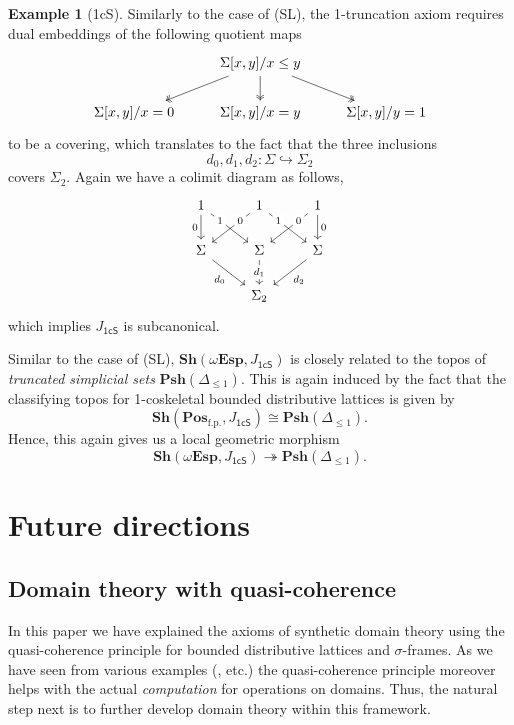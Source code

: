 \documentclass[a4paper,12pt]{amsart}
\theoremstyle{definition}
\newtheorem{example}[theorem]{Example}
\newcommand{\mb}[1]{\mathbf{#1}}
\newcommand{\mr}[1]{\mathrm{#1}}
\newcommand{\ms}[1]{\mathsf{#1}}
\newcommand{\Pos}{\mb{Pos}}
\newcommand{\sh}{\mb{Sh}}
\newcommand{\psh}{\mb{Psh}}
\newcommand{\surj}{\twoheadrightarrow}
\newcommand{\hook}{\hookrightarrow}
\newcommand{\fp}{_{\mr{f.p.}}}
\newcommand{\wTop}{\omega\mb{Esp}}
\begin{document}
\begin{example}[1cS]\label{exm:model1T}
  Similarly to the case of (SL), the 1-truncation axiom requires dual embeddings of the following quotient maps
  \[\begin{tikzcd}
    & {\Sigma[x,y]/x\le y} \\
    {\Sigma[x,y]/x=0} & {\Sigma[x,y]/x=y} & {\Sigma[x,y]/y=1}
    \arrow[two heads, from=1-2, to=2-1]
    \arrow[two heads, from=1-2, to=2-2]
    \arrow[two heads, from=1-2, to=2-3]
  \end{tikzcd}\]
  to be a covering, which translates to the fact that the three inclusions
  \[ d_0,d_1,d_2 : \Sigma \hook \Sigma_2 \]
  covers $\Sigma_2$. Again we have a colimit diagram as follows, 
  \[\begin{tikzcd}
    1 & 1 & 1 \\
    \Sigma & \Sigma & \Sigma \\
    & {\Sigma_2}
    \arrow["0"', from=1-1, to=2-1]
    \arrow["1"{description, pos=0.25}, from=1-1, to=2-2]
    \arrow["0"{description, pos=0.25}, from=1-2, to=2-1]
    \arrow["1"{description, pos=0.25}, from=1-2, to=2-3]
    \arrow["0"{description, pos=0.25}, from=1-3, to=2-2]
    \arrow["0", from=1-3, to=2-3]
    \arrow["{d_0}"', from=2-1, to=3-2]
    \arrow["{d_1}"{description}, from=2-2, to=3-2]
    \arrow["{d_2}", from=2-3, to=3-2]
  \end{tikzcd}\]
  which implies $J_{\ms{1cS}}$ is subcanonical.
  
  Similar to the case of (SL), $\sh(\wTop,J_{\ms{1cS}})$ is closely related to the topos of \emph{truncated simplicial sets} $\psh(\Delta_{\le 1})$. This is again induced by the fact that the classifying topos for 1-coskeletal bounded distributive lattices is given by 
  \[ \sh(\Pos\fp,J_{\ms{1cS}}) \cong \psh(\Delta_{\le 1}). \]
  Hence, this again gives us a local geometric morphism
  \[ \sh(\wTop,J_{\ms{1cS}}) \surj \psh(\Delta_{\le 1}). \]
\end{example}


\section{Future directions}

\subsection{Domain theory with quasi-coherence}

In this paper we have explained the axioms of synthetic domain theory using the quasi-coherence principle for bounded distributive lattices and $\sigma$-frames. As we have seen from various examples (,  etc.) the quasi-coherence principle moreover helps with the actual \emph{computation} for operations on domains. Thus, the natural step next is to further develop domain theory within this framework.
\end{document}
